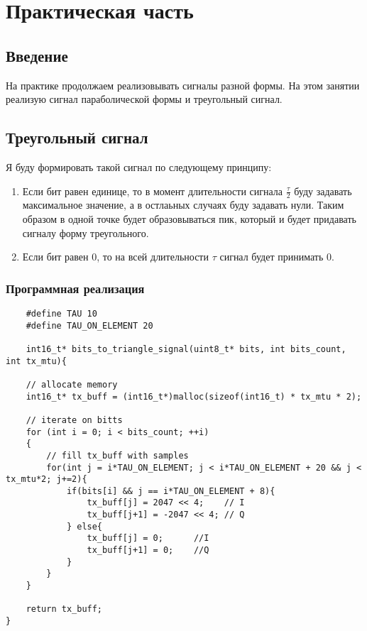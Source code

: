 \chapter{Практическая часть}
\label{ch:chap2}

\section*{\textbf{Введение}}

На практике продолжаем реализовывать сигналы разной формы. На этом занятии реализую сигнал параболической формы и треугольный сигнал.

\section*{\textbf{Треугольный сигнал}}

Я буду формировать такой сигнал по следующему принципу:

\begin{enumerate}
    \item Если бит равен единице, то в момент длительности сигнала $\frac{\tau}{2}$ буду
    задавать максимальное значение, а в остлаьных случаях буду задавать нули. Таким образом в одной точке будет образовываться пик,
    который и будет придавать сигналу форму треугольного.
    \item Если бит равен 0, то на всей длительности $\tau$ сигнал будет принимать 0.
\end{enumerate}

\subsection*{\textbf{Программная реализация}}

\begin{lstlisting}
    #define TAU 10
    #define TAU_ON_ELEMENT 20

    int16_t* bits_to_triangle_signal(uint8_t* bits, int bits_count, int tx_mtu){

    // allocate memory
    int16_t* tx_buff = (int16_t*)malloc(sizeof(int16_t) * tx_mtu * 2);

    // iterate on bitts
    for (int i = 0; i < bits_count; ++i)
    {   
        // fill tx_buff with samples
        for(int j = i*TAU_ON_ELEMENT; j < i*TAU_ON_ELEMENT + 20 && j < tx_mtu*2; j+=2){
            if(bits[i] && j == i*TAU_ON_ELEMENT + 8){
                tx_buff[j] = 2047 << 4;    // I
                tx_buff[j+1] = -2047 << 4; // Q
            } else{
                tx_buff[j] = 0;      //I
                tx_buff[j+1] = 0;    //Q
            }
        }
    }

    return tx_buff;
}
\end{lstlisting}


